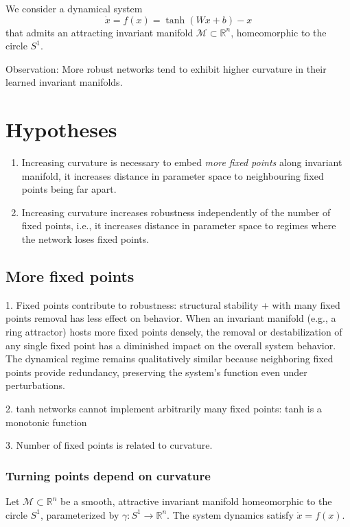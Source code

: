 \documentclass{article}
\begin{document}
We consider a dynamical system
\[
\dot{x} = f(x) = \tanh(Wx + b) - x
\]
that admits an attracting invariant manifold \( \mathcal{M} \subset \mathbb{R}^n \), homeomorphic to the circle \( S^1 \).


Observation: 
More robust networks tend to exhibit higher curvature in their learned invariant manifolds.

\section{Hypotheses}

\begin{enumerate}
\item Increasing curvature is necessary to embed \emph{more fixed points} along invariant manifold,  it increases distance in parameter space to neighbouring fixed points being far apart.
\item Increasing curvature increases robustness independently of the number of fixed points, i.e., it increases distance in parameter space to regimes where the network loses fixed points.
\end{enumerate}

\subsection{More fixed points}
1. Fixed points contribute to robustness: structural stability + with many fixed points removal has less effect on behavior.
When an invariant manifold (e.g., a ring attractor) hosts more fixed points densely, the removal or destabilization of any single fixed point has a diminished impact on the overall system behavior. The dynamical regime remains qualitatively similar because neighboring fixed points provide redundancy, preserving the system’s function even under perturbations.

2. tanh networks cannot implement arbitrarily many fixed points: tanh is a monotonic function

3. Number of fixed points is related to curvature.

\subsubsection{Turning points depend on curvature}
Let \(\mathcal{M} \subset \mathbb{R}^n\) be a smooth, attractive invariant manifold homeomorphic to the circle \(S^1\), parameterized by \(\gamma : S^1 \to \mathbb{R}^n\). The system dynamics satisfy \(\dot{x} = f(x)\).
\end{document}

